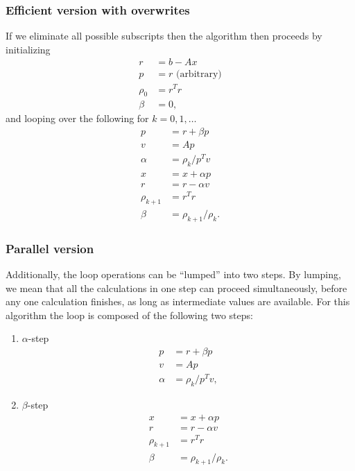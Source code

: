 \documentclass{article}
\begin{document}
\subsubsection{Efficient version with overwrites}
If we eliminate all possible subscripts then 
    the algorithm then proceeds by initializing
    \begin{subequations}\begin{align}
    r &= b - Ax \\
    p &= r \text{ (arbitrary)} \\
    \rho_{0} &= r^T r \\
    \beta &= 0,
    \end{align}\end{subequations}
and looping over the following for $k = 0, 1, \ldots$
    \begin{subequations}\begin{align}
    p &= r + \beta p \\
    v &= A p \\
    \alpha &= \rho_k / p^T v \\
    x &= x + \alpha p \\
    r &= r - \alpha v \\
    \rho_{k+1} &= r^T r \\
    \beta &= \rho_{k+1} / \rho_k.
    \end{align}\end{subequations}

\subsubsection{Parallel version}
Additionally, the loop operations can be ``lumped'' into two steps.
By lumping, we mean that all the calculations in one step can proceed
    simultaneously, before any one calculation finishes,
    as long as intermediate values are available.
For this algorithm the loop is composed of the following two steps:
\begin{enumerate}
\item $\alpha$-step
    \begin{subequations}\begin{align}
    p &= r + \beta p \\
    v &= A p \\
    \alpha &= \rho_k / p^T v,
    \end{align}\end{subequations}
\item $\beta$-step
    \begin{subequations}\begin{align}
    x &= x + \alpha p \\
    r &= r - \alpha v \\
    \rho_{k+1} &= r^T r \\
    \beta &= \rho_{k+1} / \rho_k.
    \end{align}\end{subequations}

\end{enumerate}
\end{document}
